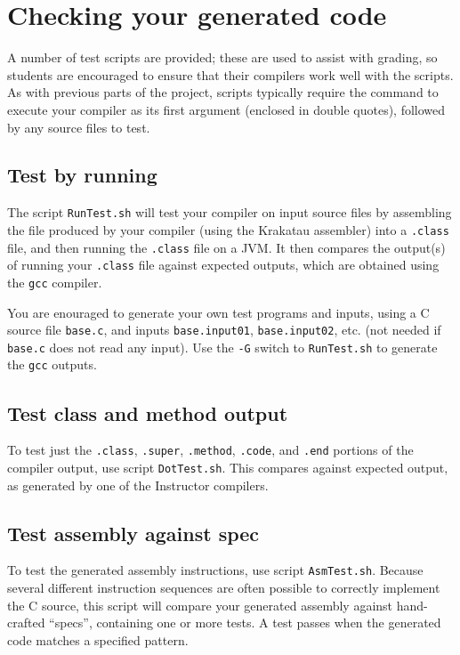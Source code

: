 \documentclass{article}
\begin{document}
\section{Checking your generated code} \label{SEC:checking}

A number of test scripts are provided;
these are used to assist with grading,
so students are encouraged to ensure that their compilers
work well with the scripts.
As with previous parts of the project,
scripts typically require the command to execute your compiler
as its first argument (enclosed in double quotes),
followed by any source files to test.

\subsection{Test by running}

The script {\tt RunTest.sh} will test your compiler on input source files
by assembling the file produced by your compiler (using the Krakatau assembler)
into a {\tt .class} file,
and then running the {\tt .class} file on a JVM.
It then compares the output(s) of running your {\tt .class} file
against expected outputs,
which are obtained using the {\tt gcc} compiler.

You are enouraged to generate your own test programs and inputs,
using a C source file {\tt base.c},
and
inputs {\tt base.input01}, {\tt base.input02}, etc.
(not needed if {\tt base.c} does not read any input).
Use the {\tt -G} switch to {\tt RunTest.sh}
to generate the {\tt gcc} outputs.

\subsection{Test class and method output}

To test just the {\tt .class}, {\tt .super}, {\tt .method}, {\tt .code},
and {\tt .end}
portions of the compiler output,
use script {\tt DotTest.sh}.
This compares against expected output,
as generated by one of the Instructor compilers.


\subsection{Test assembly against spec}

To test the generated assembly instructions,
use script {\tt AsmTest.sh}.
Because several different instruction sequences are often possible
to correctly implement the C source,
this script will compare your generated assembly against
hand-crafted ``specs'', containing one or more tests.
A test passes when the generated code matches a specified pattern.
\end{document}
